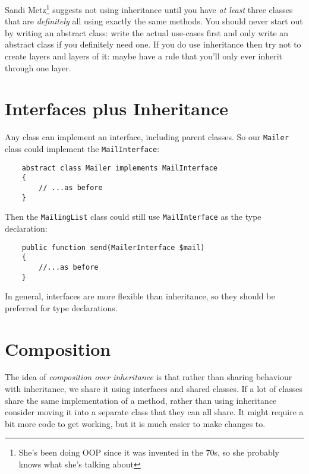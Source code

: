 Sandi Metz\footnote{She's been doing OOP since it was invented in the 70s, so she probably knows what she's talking about} suggests not using inheritance until you have \textit{at least} three classes that are \textit{definitely} all using exactly the same methods. You should never start out by writing an abstract class: write the actual use-cases first and only write an abstract class if you definitely need one. If you do use inheritance then try not to create layers and layers of it: maybe have a rule that you'll only ever inherit through one layer.

\section{Interfaces plus Inheritance}

Any class can implement an interface, including parent classes. So our \texttt{Mailer} class could implement the \texttt{MailInterface}:

\begin{verbatim}
    abstract class Mailer implements MailInterface
    {
        // ...as before
    }
\end{verbatim}

Then the \texttt{MailingList} class could still use \texttt{MailInterface} as the type declaration:

\begin{verbatim}
    public function send(MailerInterface $mail)
    {
        //...as before
    }
\end{verbatim}

In general, interfaces are more flexible than inheritance, so they should be preferred for type declarations.


\section{Composition}


The idea of \textit{composition over inheritance} is that rather than sharing behaviour with inheritance, we share it using interfaces and shared classes. If a lot of classes share the same implementation of a method, rather than using inheritance consider moving it into a separate class that they can all share. It might require a bit more code to get working, but it is much easier to make changes to.
\\

